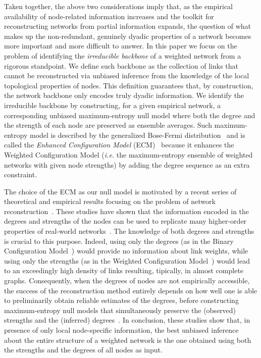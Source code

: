 \documentclass[aps,twocolumn,superscriptaddress]{revtex4-1}
\newcommand{\ie}{\emph{i.e.} }
\begin{document}
Taken together, the above two considerations imply that, as the empirical availability of node-related information increases and the toolkit for reconstructing networks from partial information expands, the question of what makes up the non-redundant, genuinely dyadic properties of a network becomes more important and more difficult to answer.
In this paper we focus on the problem of identifying the \emph{irreducible backbone} of a weighted network from a rigorous standpoint.
We define such backbone as the collection of links that cannot be reconstructed via unbiased inference from the knowledge of the local topological properties of nodes.
This definition guarantees that, by construction, the network backbone only encodes truly dyadic information.
We identify the irreducible backbone by constructing, for a given empirical network, a corresponding unbiased maximum-entropy null model where both the degree and the strength of each node are preserved as ensemble averages. 
Such maximum-entropy model is described by the generalized Bose-Fermi distribution~\cite{bose-fermi} and is called the \emph{Enhanced Configuration Model} (ECM)~\cite{mastrandrea-njp-2014} because it enhances the Weighted Configuration Model (\ie the maximum-entropy ensemble of weighted networks with given node strengths) by adding the degree sequence as an extra constraint.

The choice of the ECM as our null model is motivated by a recent series of theoretical and empirical results focusing on the problem of network reconstruction~\cite{mastrandrea-njp-2014,mastrandrea-pre-2014,cimini-pre-2015,cimini-2015-scirep,squartini-2017-ans}. These studies have shown that the information encoded in the degrees and strengths of the nodes can be used to replicate many higher-order properties of real-world networks~\cite{mastrandrea-njp-2014,mastrandrea-pre-2014}. 
The knowledge of both degrees and strengths is crucial to this purpose.
Indeed, using only the degrees (as in the Binary Configuration Model~\cite{randomizing1,randomizing3}) would provide no information about link weights, while using only the strengths (as in the Weighted Configuration Model~\cite{randomizing2,randomizing3}) would lead to an exceedingly high density of links resulting, tipically, in almost complete graphs.
Consequently, when the degrees of nodes are not empirically accessible, the success of the reconstruction method entirely depends on how well one is able to preliminarily obtain reliable estimates of the degrees, before constructing maximum-entropy null models that simultaneously preserve the (observed) strengths and the (inferred) degrees~\cite{mastrandrea-pre-2014,cimini-pre-2015,cimini-2015-scirep,squartini-2017-ans}.
In conclusion, these studies show that, in presence of only local node-specific information, the best unbiased inference about the entire structure of a weighted network is the one obtained using  both the strengths and the degrees of all nodes as input.
\end{document}
